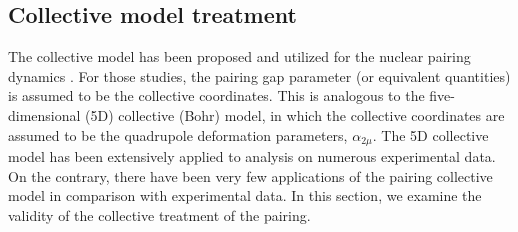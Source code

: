 \documentclass[%
superscriptaddress,
preprint,
showpacs,
nofootinbib,
amsmath,amssymb,
aps,
prc,
floatfix ]%
{revtex4-1}
\begin{document}
\subsection{Collective model treatment}

The collective model has been proposed
and utilized for the nuclear pairing dynamics
\cite{BBPK70,delta1,delta3}.
For those studies, the pairing gap parameter (or equivalent quantities)
is assumed to be the collective coordinates.
This is analogous to the five-dimensional (5D) collective (Bohr) model,
in which the collective coordinates are assumed to be the
quadrupole deformation parameters, $\alpha_{2\mu}$.
The 5D collective model has been 
extensively applied to analysis on numerous experimental data.
On the contrary, there have been very few applications of
the pairing collective model
in comparison with experimental data.
In this section, we examine the validity of
the collective treatment of the pairing.

\end{document}
